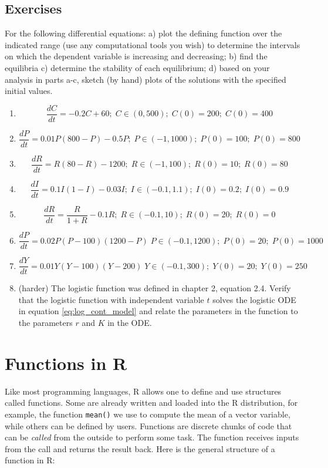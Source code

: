 \documentclass[
]{book}
\theoremstyle{definition}
\theoremstyle{definition}
\theoremstyle{definition}
\theoremstyle{remark}
\begin{document}
\hypertarget{exercises-19}{%
\subsection{Exercises}\label{exercises-19}}

For the following differential equations: a) plot the defining function over the indicated range (use any computational tools you wish) to determine the intervals on which the dependent variable is increasing and decreasing; b) find the equilibria c) determine the stability of each equilibrium; d) based on your analysis in parts a-c, sketch (by hand) plots of the solutions with the specified initial values.

\begin{enumerate}
\def\labelenumi{\arabic{enumi}.}
\item
  \[ \frac{dC}{dt} = -0.2C + 60; \; C \in (0,500); \; C(0) = 200; \; C(0) = 400 \]
\item
  \[ \frac{dP}{dt} = 0.01P(800-P) - 0.5P; \; P \in (-1, 1000); \; P(0) = 100; \; P(0) = 800\]
\item
  \[ \frac{dR}{dt} = R(80-R) - 1200; \; R \in (-1, 100); \; R(0) = 10; \; R(0) = 80\]
\item
  \[ \frac{dI}{dt} = 0.1I(1-I) - 0.03I; \;  I \in (-0.1, 1.1); \; I(0) = 0.2; \; I(0) = 0.9 \]
\item
  \[  \frac{dR}{dt} = \frac{R}{1+R}-0.1R; \; R \in (-0.1, 10); \; R(0) = 20; \; R(0) = 0 \]
\item
  \[  \frac{dP}{dt} =  0.02P(P-100)(1200-P) \; P \in (-0.1, 1200); \; P(0) = 20; \; P(0) = 1000 \]
\item
  \[  \frac{dY}{dt} =  0.01Y(Y-100)(Y-200) \; Y \in (-0.1, 300); \; Y(0) = 20; \; Y(0) = 250 \]
\item
  (harder) The logistic function was defined in chapter 2, equation 2.4. Verify that the logistic function with independent variable \(t\) solves the logistic ODE in equation \ref{eq:log_cont_model} and relate the parameters in the function to the parameters \(r\) and \(K\) in the ODE.
\end{enumerate}

\hypertarget{functions-in-r}{%
\section{Functions in R}\label{functions-in-r}}

Like most programming languages, R allows one to define and use structures called functions. Some are already written and loaded into the R distribution, for example, the function \texttt{mean()} we use to compute the mean of a vector variable, while others can be defined by users. Functions are discrete chunks of code that can be \emph{called} from the outside to perform some task. The function receives inputs from the call and returns the result back. Here is the general structure of a function in R:
\end{document}
